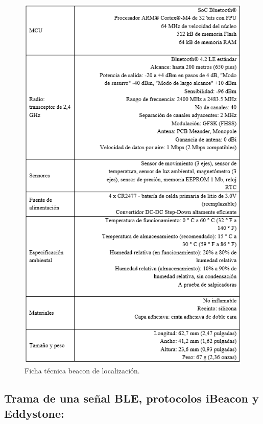 \documentclass[conference,compsoc,onecolumn]{IEEEtran}
\begin{document}
\begin{figure}[H]
\centering
\includegraphics[keepaspectratio, scale=1]{Imagenes/Imagen3.png}
\caption{Ficha técnica beacon de localización.}
\end{figure}


 

\subsection{Trama de una señal BLE, protocolos iBeacon y Eddystone:}        
         
\end{document}
